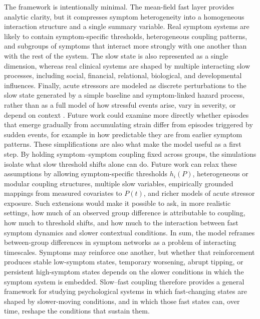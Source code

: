 \documentclass[man,12pt,floatsintext]{apa7}
\begin{document}
The framework is intentionally minimal. The mean-field fast layer provides analytic clarity, but it compresses symptom heterogeneity into a homogeneous interaction structure and a single summary variable. Real symptom systems are likely to contain symptom-specific thresholds, heterogeneous coupling patterns, and subgroups of symptoms that interact more strongly with one another than with the rest of the system. The slow state is also represented as a single dimension, whereas real clinical systems are shaped by multiple interacting slow processes, including social, financial, relational, biological, and developmental influences. Finally, acute stressors are modeled as discrete perturbations to the slow state generated by a simple baseline and symptom-linked hazard process, rather than as a full model of how stressful events arise, vary in severity, or depend on context \parencite{hammen2006stress,dohrenwend2006inventorying,cohen2019ten}. Future work could examine more directly whether episodes that emerge gradually from accumulating strain differ from episodes triggered by sudden events, for example in how predictable they are from earlier symptom patterns.
These simplifications are also what make the model useful as a first step. By holding symptom--symptom coupling fixed across groups, the simulations isolate what slow threshold shifts alone can do. Future work can relax these assumptions by allowing symptom-specific thresholds \(h_i(P)\), heterogeneous or modular coupling structures, multiple slow variables, empirically grounded mappings from measured covariates to \(P(t)\), and richer models of acute stressor exposure. Such extensions would make it possible to ask, in more realistic settings, how much of an observed group difference is attributable to coupling, how much to threshold shifts, and how much to the interaction between fast symptom dynamics and slower contextual conditions.
In sum, the model reframes between-group differences in symptom networks as a problem of interacting timescales. Symptoms may reinforce one another, but whether that reinforcement produces stable low-symptom states, temporary worsening, abrupt tipping, or persistent high-symptom states depends on the slower conditions in which the symptom system is embedded. Slow--fast coupling therefore provides a general framework for studying psychological systems in which fast-changing states are shaped by slower-moving conditions, and in which those fast states can, over time, reshape the conditions that sustain them.
\printbibliography
\appendix
\end{document}

